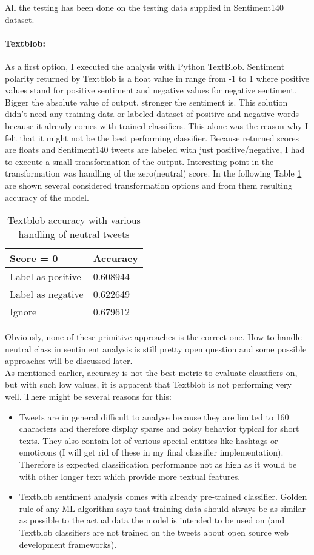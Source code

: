 All the testing has been done on the testing data supplied in Sentiment140 dataset.

\paragraph{Textblob:}
As a first option, I executed the analysis with Python TextBlob. Sentiment polarity returned by Textblob is a float value in range from -1 to 1 where positive values stand for positive sentiment and negative values for negative sentiment. Bigger the absolute value of output, stronger the sentiment is. This solution didn't need any training data or labeled dataset of positive and negative words because it already comes with trained classifiers. This alone was the reason why I felt that it might not be the best performing classifier. Because returned scores are floats and Sentiment140 tweets are labeled with just positive/negative, I had to execute a small transformation of the output. Interesting point in the transformation was handling of the zero(neutral) score. In the following Table \ref{table:TextblobNeutralTweetResolvingResults} are shown several considered transformation options and from them resulting accuracy of the model.
\begin{table}[H]
\centering
\begin{tabular}{ |p{3cm}||p{3cm}|}
 \hline
\textbf{ Score = 0 }& \textbf{Accuracy}\\
 \hline
 Label as positive   & 0.608944\\ \hline
 Label as negative & 0.622649\\ \hline
 Ignore & 0.679612\\ \hline 
\end{tabular}
\caption{Textblob accuracy with various handling of neutral tweets}
\label{table:TextblobNeutralTweetResolvingResults}
\end{table}
Obviously, none of these primitive approaches is the correct one. How to handle neutral class in sentiment analysis is still pretty open question and some possible approaches will be discussed later.\\
As mentioned earlier, accuracy is not the best metric to evaluate classifiers on, but with such low values, it is apparent that Textblob is not performing very well. There might be several reasons for this:
\begin{itemize}
\item Tweets are in general difficult to analyse because they are limited to 160 characters and therefore display sparse and noisy behavior typical for short texts. They also contain lot of various special entities like hashtags or emoticons (I will get rid of these in my final classifier implementation). Therefore is expected classification performance not as high as it would be with other longer text which provide more textual features.
\item Textblob sentiment analysis comes with already pre-trained classifier. Golden rule of any ML algorithm says that training data should always be as similar as possible to the actual data the model is intended to be used on (and Textblob classifiers are not trained on the tweets about open source web development frameworks).
\end{itemize}
